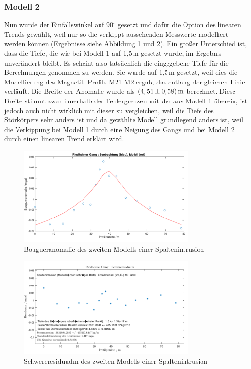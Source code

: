 \subsubsection{Modell 2}

Nun wurde der Einfallswinkel auf 90$^\circ$ gesetzt und dafür die Option des linearen Trends gewählt, weil nur so die verkippt aussehenden Messwerte modelliert werden können (Ergebnisse siehe Abbildung \ref{fig:modell2} und \ref{fig:modell2_res}). Ein großer Unterschied ist, dass die Tiefe, die wie bei Modell 1 auf 1,5\,m gesetzt wurde, im Ergebnis unverändert bleibt. Es scheint also tatsächlich die eingegebene Tiefe für die Berechnungen genommen zu werden. Sie wurde auf 1,5\,m gesetzt, weil dies die Modellierung des Magnetik-Profils M21-M2 ergab, das entlang der gleichen Linie verläuft. Die Breite der Anomalie wurde als $(4,54\pm0,58)\,\mathrm{m}$ berechnet. Diese Breite stimmt zwar innerhalb der Fehlergrenzen mit der aus Modell 1 überein, ist jedoch auch nicht wirklich mit dieser zu vergleichen, weil die Tiefe des Störkörpers sehr anders ist und da gewählte Modell grundlegend anders ist, weil die Verkippung bei Modell 1 durch eine Neigung des Gangs und bei Modell 2 durch einen linearen Trend erklärt wird.

\begin{figure}[!ht]
 \centering
 \includegraphics[width=0.8\textwidth]{fig/modell2}
 \caption{Bougueranomalie des zweiten Modells einer Spaltenintrusion}
 \label{fig:modell2}
\end{figure}

\begin{figure}[!ht]
 \centering
 \includegraphics[width=0.8\textwidth]{fig/modell2_res}
 \caption{Schwereresiduudm des zweiten Modells einer Spaltenintrusion}
 \label{fig:modell2_res}
\end{figure}

